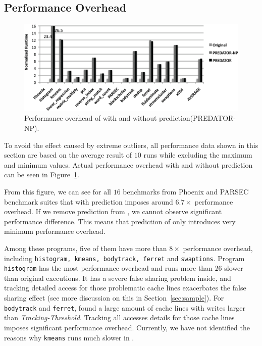 \subsection{Performance Overhead}
\label{sec:perfoverhead}

\begin{figure}[!ht]
\begin{center}
\includegraphics[width=6.5in]{fig/perf}
\end{center}
\caption{
Performance overhead of \Predator{} with and without prediction(PREDATOR-NP).
\label{fig:perf}}
\end{figure}

To avoid the effect caused by extreme outliers, all performance data shown in this section
are based on the average result of $10$ runs while excluding the maximum and minimum values.
Actual performance overhead with and without prediction 
can be seen in Figure~\ref{fig:perf}. 

From this figure, we can see for all $16$ benchmarks from Phoenix and PARSEC
benchmark suites that \Predator{} with prediction imposes around $6.7\times$
performance overhead. 
If we remove prediction from \Predator{}, we cannot observe significant performance difference.
This means that prediction of \Predator{} only introduces very minimum performance overhead. 

Among these programs, five of them have more than $8\times$ performance overhead, 
including \texttt{histogram, kmeans, bodytrack, ferret} and \texttt{swaptions}. 
Program \texttt{histogram} has the most performance overhead and 
runs more than $26$ slower than original executions. 
It has a severe false sharing problem inside, and tracking detailed access for those
problematic cache lines exacerbates the 
false sharing effect (see more discussion on this in Section~\ref{sec:sample}). 
For \texttt{bodytrack} and \texttt{ferret}, \Predator{} found a large amount of cache lines with 
writes larger than {\it Tracking-Threshold}. 
Tracking all accesses details for those cache lines 
imposes significant performance overhead. 
Currently, we have not identified the reasons 
why \texttt{kmeans} runs much slower in \Predator{}.   

